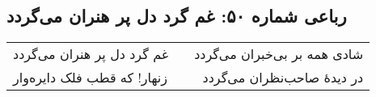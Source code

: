 \begin{center}
\section*{رباعی شماره ۵۰: غم گرد دل پر هنران می‌گردد}
\label{sec:050}
\begin{longtable}{l p{0.5cm} r}
غم گرد دل پر هنران می‌گردد
&&
شادی همه بر بی‌خبران می‌گردد
\\
زنهار! که قطب فلک دایره‌وار
&&
در دیدهٔ صاحب‌نظران می‌گردد
\\
\end{longtable}
\end{center}
